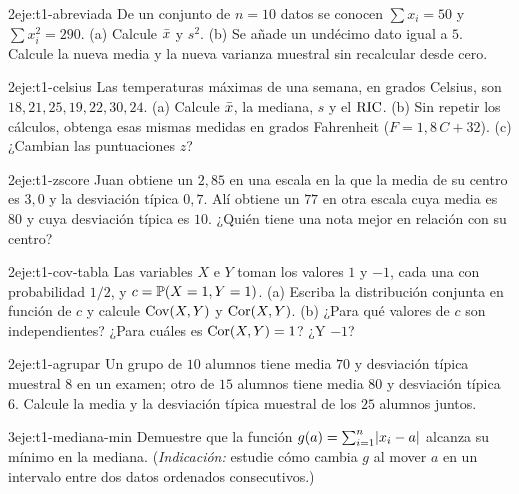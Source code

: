 \begin{ejercicio}{2}{eje:t1-abreviada}
De un conjunto de $n=10$ datos se conocen $\sum x_i=50$ y $\sum x_i^{2}=290$. (a) Calcule $\bar{x}$ y $s^{2}$. (b) Se añade un undécimo dato igual a $5$. Calcule la nueva media y la nueva varianza muestral sin recalcular desde cero.
\end{ejercicio}

\begin{ejercicio}{2}{eje:t1-celsius}
Las temperaturas máximas de una semana, en grados Celsius, son $18,21,25,19,22,30,24$. (a) Calcule $\bar{x}$, la mediana, $s$ y el $\operatorname{RIC}$. (b) Sin repetir los cálculos, obtenga esas mismas medidas en grados Fahrenheit ($F=1{,}8\,C+32$). (c) ¿Cambian las puntuaciones $z$?
\end{ejercicio}

\begin{ejercicio}{2}{eje:t1-zscore}
Juan obtiene un $2{,}85$ en una escala en la que la media de su centro es $3{,}0$ y la desviación típica $0{,}7$. Alí obtiene un $77$ en otra escala cuya media es $80$ y cuya desviación típica es $10$. ¿Quién tiene una nota mejor en relación con su centro?
\end{ejercicio}

\begin{ejercicio}{2}{eje:t1-cov-tabla}
Las variables $X$ e $Y$ toman los valores $1$ y $-1$, cada una con probabilidad $1/2$, y $c=\mathbb{P}(X=1,Y=1)$. (a) Escriba la distribución conjunta en función de $c$ y calcule $\operatorname{Cov}(X,Y)$ y $\operatorname{Cor}(X,Y)$. (b) ¿Para qué valores de $c$ son independientes? ¿Para cuáles es $\operatorname{Cor}(X,Y)=1$? ¿Y $-1$?
\end{ejercicio}

\begin{ejercicio}{2}{eje:t1-agrupar}
Un grupo de $10$ alumnos tiene media $70$ y desviación típica muestral $8$ en un examen; otro de $15$ alumnos tiene media $80$ y desviación típica $6$. Calcule la media y la desviación típica muestral de los $25$ alumnos juntos.
\end{ejercicio}

\begin{ejercicio}{3}{eje:t1-mediana-min}
Demuestre que la función $g(a)=\sum_{i=1}^{n}\lvert x_i-a\rvert$ alcanza su mínimo en la mediana. (\emph{Indicación:} estudie cómo cambia $g$ al mover $a$ en un intervalo entre dos datos ordenados consecutivos.)
\end{ejercicio}

